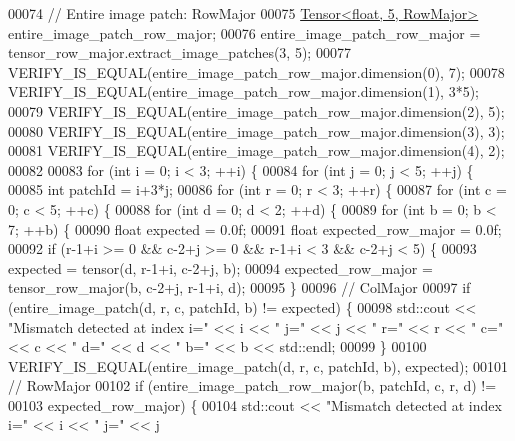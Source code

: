 \begin{DoxyCode}
00074   \textcolor{comment}{// Entire image patch: RowMajor}
00075   \hyperlink{class_eigen_1_1_tensor}{Tensor<float, 5, RowMajor>} entire\_image\_patch\_row\_major;
00076   entire\_image\_patch\_row\_major = tensor\_row\_major.extract\_image\_patches(3, 5);
00077   VERIFY\_IS\_EQUAL(entire\_image\_patch\_row\_major.dimension(0), 7);
00078   VERIFY\_IS\_EQUAL(entire\_image\_patch\_row\_major.dimension(1), 3*5);
00079   VERIFY\_IS\_EQUAL(entire\_image\_patch\_row\_major.dimension(2), 5);
00080   VERIFY\_IS\_EQUAL(entire\_image\_patch\_row\_major.dimension(3), 3);
00081   VERIFY\_IS\_EQUAL(entire\_image\_patch\_row\_major.dimension(4), 2);
00082 
00083   \textcolor{keywordflow}{for} (\textcolor{keywordtype}{int} i = 0; i < 3; ++i) \{
00084     \textcolor{keywordflow}{for} (\textcolor{keywordtype}{int} j = 0; j < 5; ++j) \{
00085       \textcolor{keywordtype}{int} patchId = i+3*j;
00086       \textcolor{keywordflow}{for} (\textcolor{keywordtype}{int} r = 0; r < 3; ++r) \{
00087         \textcolor{keywordflow}{for} (\textcolor{keywordtype}{int} c = 0; c < 5; ++c) \{
00088           \textcolor{keywordflow}{for} (\textcolor{keywordtype}{int} d = 0; d < 2; ++d) \{
00089             \textcolor{keywordflow}{for} (\textcolor{keywordtype}{int} b = 0; b < 7; ++b) \{
00090               \textcolor{keywordtype}{float} expected = 0.0f;
00091               \textcolor{keywordtype}{float} expected\_row\_major = 0.0f;
00092               \textcolor{keywordflow}{if} (r-1+i >= 0 && c-2+j >= 0 && r-1+i < 3 && c-2+j < 5) \{
00093                 expected = tensor(d, r-1+i, c-2+j, b);
00094                 expected\_row\_major = tensor\_row\_major(b, c-2+j, r-1+i, d);
00095               \}
00096               \textcolor{comment}{// ColMajor}
00097               \textcolor{keywordflow}{if} (entire\_image\_patch(d, r, c, patchId, b) != expected) \{
00098                 std::cout << \textcolor{stringliteral}{"Mismatch detected at index i="} << i << \textcolor{stringliteral}{" j="} << j << \textcolor{stringliteral}{" r="} << r << \textcolor{stringliteral}{" c="} << c
       << \textcolor{stringliteral}{" d="} << d << \textcolor{stringliteral}{" b="} << b << std::endl;
00099               \}
00100               VERIFY\_IS\_EQUAL(entire\_image\_patch(d, r, c, patchId, b), expected);
00101               \textcolor{comment}{// RowMajor}
00102               \textcolor{keywordflow}{if} (entire\_image\_patch\_row\_major(b, patchId, c, r, d) !=
00103                   expected\_row\_major) \{
00104                 std::cout << \textcolor{stringliteral}{"Mismatch detected at index i="} << i << \textcolor{stringliteral}{" j="} << j

\end{DoxyCode}
